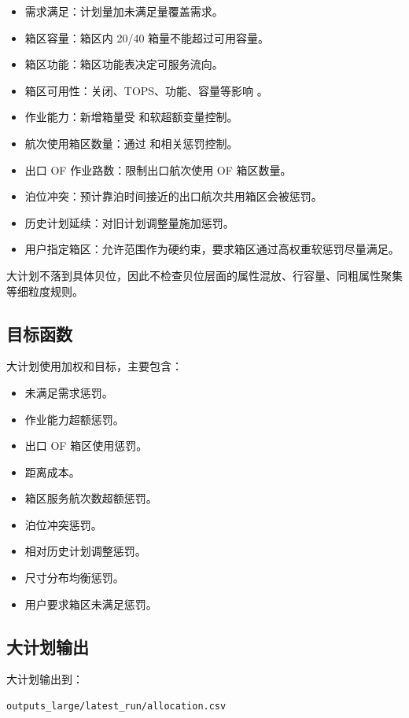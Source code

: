 \documentclass[UTF8,fontset=windows,zihao=-4]{ctexart}
\newcommand{\code}[1]{\texttt{\detokenize{#1}}}
\begin{document}
\begin{itemize}
  \item 需求满足：计划量加未满足量覆盖需求。
  \item 箱区容量：箱区内 20/40 箱量不能超过可用容量。
  \item 箱区功能：箱区功能表决定可服务流向。
  \item 箱区可用性：关闭、TOPS、功能、容量等影响 \code{E20/E40}。
  \item 作业能力：新增箱量受 \code{H} 和软超额变量控制。
  \item 航次使用箱区数量：通过 \code{y} 和相关惩罚控制。
  \item 出口 OF 作业路数：限制出口航次使用 OF 箱区数量。
  \item 泊位冲突：预计靠泊时间接近的出口航次共用箱区会被惩罚。
  \item 历史计划延续：对旧计划调整量施加惩罚。
  \item 用户指定箱区：允许范围作为硬约束，要求箱区通过高权重软惩罚尽量满足。
\end{itemize}

大计划不落到具体贝位，因此不检查贝位层面的属性混放、行容量、同粗属性聚集等细粒度规则。

\subsection{目标函数}

大计划使用加权和目标，主要包含：

\begin{itemize}
  \item 未满足需求惩罚。
  \item 作业能力超额惩罚。
  \item 出口 OF 箱区使用惩罚。
  \item 距离成本。
  \item 箱区服务航次数超额惩罚。
  \item 泊位冲突惩罚。
  \item 相对历史计划调整惩罚。
  \item 尺寸分布均衡惩罚。
  \item 用户要求箱区未满足惩罚。
\end{itemize}

\subsection{大计划输出}

大计划输出到：

\begin{Verbatim}[fontsize=\small,breaklines=true,breakanywhere=true]
outputs_large/latest_run/allocation.csv
\end{Verbatim}
\end{document}
